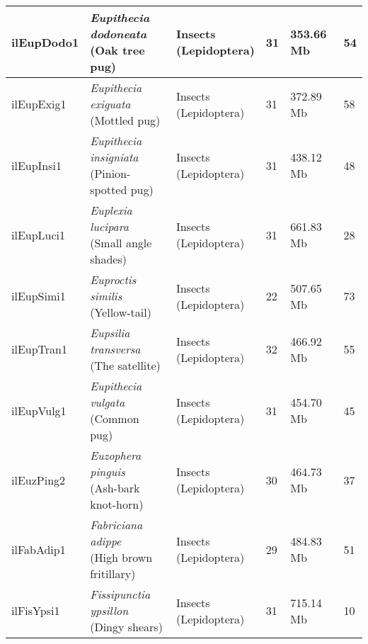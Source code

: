 \begin{centering}
\begin{longtable}{l|l|l|l|l|l}
ilEupDodo1 & \makecell[{l}]{\textit{Eupithecia dodoneata} \\ (Oak tree pug)} & \makecell[{l}]{Insects \\ (Lepidoptera)} & 31 & 353.66 Mb & 54  \\ \hline
ilEupExig1 & \makecell[{l}]{\textit{Eupithecia exiguata} \\ (Mottled pug)} & \makecell[{l}]{Insects \\ (Lepidoptera)} & 31 & 372.89 Mb & 58  \\ \hline
ilEupInsi1 & \makecell[{l}]{\textit{Eupithecia insigniata} \\ (Pinion-spotted pug)} & \makecell[{l}]{Insects \\ (Lepidoptera)} & 31 & 438.12 Mb & 48  \\ \hline
ilEupLuci1 & \makecell[{l}]{\textit{Euplexia lucipara} \\ (Small angle shades)} & \makecell[{l}]{Insects \\ (Lepidoptera)} & 31 & 661.83 Mb & 28  \\ \hline
ilEupSimi1 & \makecell[{l}]{\textit{Euproctis similis} \\ (Yellow-tail)} & \makecell[{l}]{Insects \\ (Lepidoptera)} & 22 & 507.65 Mb & 73  \\ \hline
ilEupTran1 & \makecell[{l}]{\textit{Eupsilia transversa} \\ (The satellite)} & \makecell[{l}]{Insects \\ (Lepidoptera)} & 32 & 466.92 Mb & 55  \\ \hline
ilEupVulg1 & \makecell[{l}]{\textit{Eupithecia vulgata} \\ (Common pug)} & \makecell[{l}]{Insects \\ (Lepidoptera)} & 31 & 454.70 Mb & 45  \\ \hline
ilEuzPing2 & \makecell[{l}]{\textit{Euzophera pinguis} \\ (Ash-bark knot-horn)} & \makecell[{l}]{Insects \\ (Lepidoptera)} & 30 & 464.73 Mb & 37  \\ \hline
ilFabAdip1 & \makecell[{l}]{\textit{Fabriciana adippe} \\ (High brown fritillary)} & \makecell[{l}]{Insects \\ (Lepidoptera)} & 29 & 484.83 Mb & 51  \\ \hline
ilFisYpsi1 & \makecell[{l}]{\textit{Fissipunctia ypsillon} \\ (Dingy shears)} & \makecell[{l}]{Insects \\ (Lepidoptera)} & 31 & 715.14 Mb & 10  \\ \hline

\end{longtable}
\end{centering}
